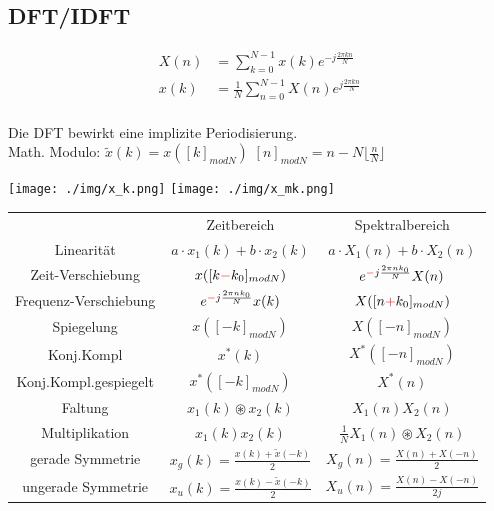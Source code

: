 \documentclass[10pt,a4paper]{article}
\begin{document}
  \subsection{DFT/IDFT}
  \begin{mdframed}[style=exercise]
    \begin{align}
        X(n)&=\sum_{k=0}^{N-1} x(k)e^{-j\frac{2\pi kn}{N}} \\
        x(k)&=\frac{1}{N}\sum_{n=0}^{N-1} X(n)e^{j\frac{2\pi kn}{N}} \\
    \end{align}
  \end{mdframed}
Die DFT bewirkt eine implizite Periodisierung. \\ 
Math. Modulo:
$\tilde{x}(k) = x([k]_{modN})$ 
$[n]_{modN}=n-N \lfloor \frac{n}{N} \rfloor$
  \begin{center}
      \texttt{[image: ./img/x\_k.png]}
      \texttt{[image: ./img/x\_mk.png]}
  \end{center}
\scriptsize
\begin{center}
\begin{tabular}{ | c | c | c | }
\cline{1-3}
        & Zeitbereich & Spektralbereich \\
\cline{1-3}
        Linearität & $a\cdot x_1(k)+ b\cdot x_2(k)$ & $a\cdot X_1(n) +b\cdot X_2(n)$ \\
\cline{1-3}
        Zeit-Verschiebung & $x([k\textcolor{red}{-}k_0]_{modN})$ & $e^{\textcolor{red}{-}j\frac{2\pi nk_0}{N}} X(n)$\\
\cline{1-3}
        Frequenz-Verschiebung & $e^{\textcolor{red}{-}j\frac{2\pi nk_0}{N}} x(k)$ & $X([n\textcolor{red}{+}k_0]_{modN})$ \\  
\cline{1-3}
        Spiegelung & $x([-k]_{modN})$ & $X([-n]_{modN})$ \\  
\cline{1-3}
        Konj.Kompl & $x^*(k)$& $X^*([-n]_{modN})$\\ 
\cline{1-3}
        Konj.Kompl.gespiegelt & $x^*([-k]_{modN})$& $X^*(n)$\\ 
\cline{1-3}
        Faltung & $x_1(k) \circledast x_2(k)$ & $X_1(n)X_2(n)$ \\  
\cline{1-3}
        Multiplikation & $x_1(k)x_2(k)$ & $\frac{1}{N} X_1(n) \circledast X_2(n)$ \\
\cline{1-3}
        gerade Symmetrie & $x_g(k)=\frac{x(k)+\tilde{x}(-k)}{2}$ & $X_g(n)=\frac{X(n)+X(-n)}{2}$ \\
\cline{1-3}
        ungerade Symmetrie & $x_u(k)=\frac{x(k)-\tilde{x}(-k)}{2}$ & $X_u(n)=\frac{X(n)-X(-n)}{2j}$ \\
\cline{1-3}
\end{tabular}
\end{center}
\end{document}
